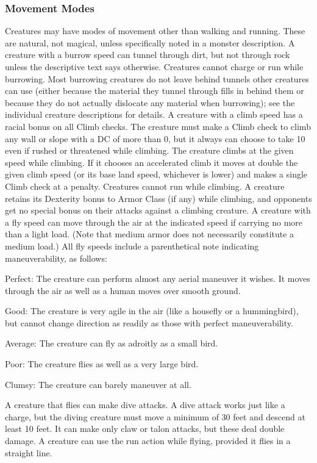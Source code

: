 \subsubsection{Movement Modes} Creatures may have modes of movement other than walking and running. These are natural, not magical, unless specifically noted in a monster description.
 A creature with a burrow speed can tunnel through dirt, but not through rock unless the descriptive text says otherwise. Creatures cannot charge or run while burrowing. Most burrowing creatures do not leave behind tunnels other creatures can use (either because the material they tunnel through fills in behind them or because they do not actually dislocate any material when burrowing); see the individual creature descriptions for details.
 A creature with a climb speed has a  racial bonus on all Climb checks. The creature must make a Climb check to climb any wall or slope with a DC of more than 0, but it always can choose to take 10 even if rushed or threatened while climbing. The creature climbs at the given speed while climbing. If it chooses an accelerated climb it moves at double the given climb speed (or its base land speed, whichever is lower) and makes a single Climb check at a  penalty. Creatures cannot run while climbing. A creature retains its Dexterity bonus to Armor Class (if any) while climbing, and opponents get no special bonus on their attacks against a climbing creature.
 A creature with a fly speed can move through the air at the indicated speed if carrying no more than a light load. (Note that medium armor does not necessarily constitute a medium load.) All fly speeds include a parenthetical note indicating maneuverability, as follows:
\begin{itemize*}
\item Perfect: The creature can perform almost any aerial maneuver it wishes. It moves through the air as well as a human moves over smooth ground.
\item Good: The creature is very agile in the air (like a housefly or a hummingbird), but cannot change direction as readily as those with perfect maneuverability.
\item Average: The creature can fly as adroitly as a small bird. 
\item Poor: The creature flies as well as a very large bird.
\item Clumsy: The creature can barely maneuver at all.
\end{itemize*}
A creature that flies can make dive attacks. A dive attack works just like a charge, but the diving creature must move a minimum of 30 feet and descend at least 10 feet. It can make only claw or talon attacks, but these deal double damage. A creature can use the run action while flying, provided it flies in a straight line.

